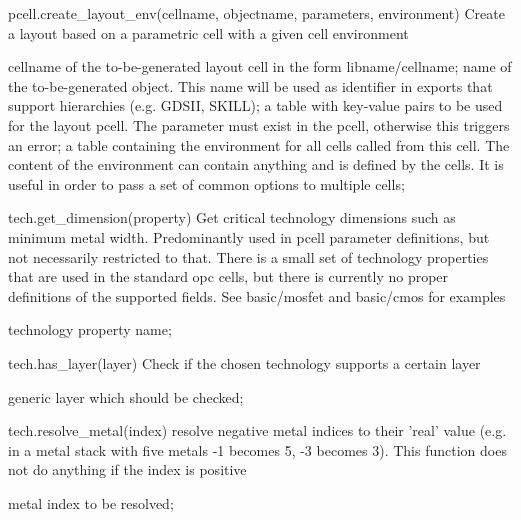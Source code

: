\begin{APIfunc}{pcell.create\_layout\_env(cellname, objectname, parameters, environment)}
    Create a layout based on a parametric cell with a given cell environment
    \begin{APIparameters}
            cellname of the to-be-generated layout cell in the form libname/cellname;
            name of the to-be-generated object. This name will be used as identifier in exports that support hierarchies (e.g. GDSII, SKILL);
            a table with key-value pairs to be used for the layout pcell. The parameter must exist in the pcell, otherwise this triggers an error;
            a table containing the environment for all cells called from this cell. The content of the environment can contain anything and is defined by the cells. It is useful in order to pass a set of common options to multiple cells;
    \end{APIparameters}
\end{APIfunc}
\begin{APIfunc}{tech.get\_dimension(property)}
    Get critical technology dimensions such as minimum metal width. Predominantly used in pcell parameter definitions, but not necessarily restricted to that. There is a small set of technology properties that are used in the standard opc cells, but there is currently no proper definitions of the supported fields. See basic/mosfet and basic/cmos for examples
    \begin{APIparameters}
            technology property name;
    \end{APIparameters}
\end{APIfunc}
\begin{APIfunc}{tech.has\_layer(layer)}
    Check if the chosen technology supports a certain layer
    \begin{APIparameters}
            generic layer which should be checked;
    \end{APIparameters}
\end{APIfunc}
\begin{APIfunc}{tech.resolve\_metal(index)}
    resolve negative metal indices to their 'real' value (e.g. in a metal stack with five metals -1 becomes 5, -3 becomes 3). This function does not do anything if the index is positive
    \begin{APIparameters}
            metal index to be resolved;
    \end{APIparameters}
\end{APIfunc}
